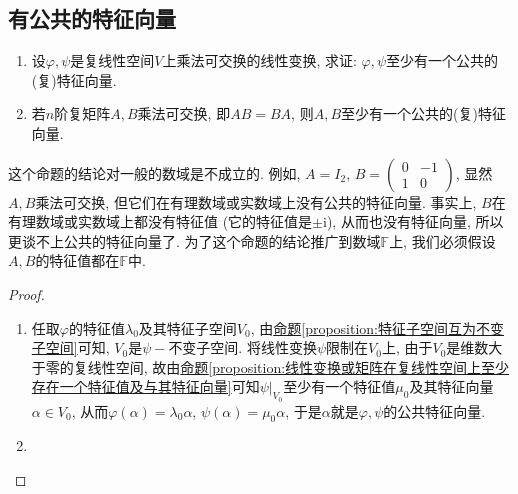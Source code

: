 \documentclass[../../main.tex]{subfiles}%
\begin{document}
\subsection{有公共的特征向量}

\begin{proposition}\label{proposition:乘法可交换必有公共的特征向量}
\begin{enumerate}
\item 设\(\varphi,\psi\)是复线性空间\(V\)上乘法可交换的线性变换, 求证: \(\varphi,\psi\)至少有一个公共的(复)特征向量.

\item 若\(n\)阶复矩阵\(A,B\)乘法可交换, 即\(AB = BA\), 则\(A,B\)至少有一个公共的(复)特征向量. 
\end{enumerate}
\end{proposition}
\begin{remark}
这个命题的结论对一般的数域是不成立的. 例如, \(A = I_{2}\), \(B=\begin{pmatrix}
0& -1\\
1& 0
\end{pmatrix}\), 显然\(A,B\)乘法可交换, 但它们在有理数域或实数域上没有公共的特征向量. 事实上, \(B\)在有理数域或实数域上都没有特征值 (它的特征值是\(\pm\mathrm{i}\)), 从而也没有特征向量, 所以更谈不上公共的特征向量了. 为了这个命题的结论推广到数域\(\mathbb{F}\)上, 我们必须假设\(A,B\)的特征值都在\(\mathbb{F}\)中.
\end{remark}
\begin{proof}
\begin{enumerate}
\item 任取\(\varphi\)的特征值\(\lambda_{0}\)及其特征子空间\(V_{0}\), 由\hyperref[proposition:特征子空间互为不变子空间]{命题\ref{proposition:特征子空间互为不变子空间}}可知, \(V_{0}\)是\(\psi -\)不变子空间. 将线性变换\(\psi\)限制在\(V_{0}\)上, 由于\(V_{0}\)是维数大于零的复线性空间, 故由\hyperref[proposition:线性变换或矩阵在复线性空间上至少存在一个特征值及与其特征向量]{命题\ref{proposition:线性变换或矩阵在复线性空间上至少存在一个特征值及与其特征向量}}可知\(\psi|_{V_{0}}\)至少有一个特征值\(\mu_{0}\)及其特征向量\(\alpha \in V_{0}\), 从而\(\varphi(\alpha)=\lambda_{0}\alpha\), \(\psi(\alpha)=\mu_{0}\alpha\), 于是\(\alpha\)就是\(\varphi,\psi\)的公共特征向量. 

\item 
\end{enumerate}

\end{proof}
\end{document}
